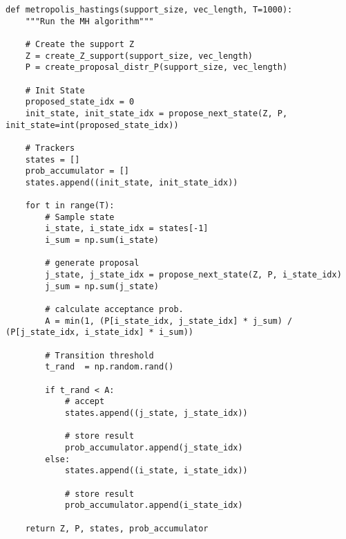 \label{sec:appendix1}

\begin{verbatim}
def metropolis_hastings(support_size, vec_length, T=1000):
    """Run the MH algorithm"""
    
    # Create the support Z
    Z = create_Z_support(support_size, vec_length)
    P = create_proposal_distr_P(support_size, vec_length)
    
    # Init State
    proposed_state_idx = 0
    init_state, init_state_idx = propose_next_state(Z, P, init_state=int(proposed_state_idx))
    
    # Trackers
    states = []
    prob_accumulator = []
    states.append((init_state, init_state_idx))
    
    for t in range(T):
        # Sample state
        i_state, i_state_idx = states[-1]
        i_sum = np.sum(i_state)
  
        # generate proposal
        j_state, j_state_idx = propose_next_state(Z, P, i_state_idx)
        j_sum = np.sum(j_state)
    
        # calculate acceptance prob.
        A = min(1, (P[i_state_idx, j_state_idx] * j_sum) / (P[j_state_idx, i_state_idx] * i_sum))
        
        # Transition threshold
        t_rand  = np.random.rand()

        if t_rand < A:
            # accept
            states.append((j_state, j_state_idx))
            
            # store result
            prob_accumulator.append(j_state_idx)
        else:
            states.append((i_state, i_state_idx))
            
            # store result
            prob_accumulator.append(i_state_idx)
            
    return Z, P, states, prob_accumulator
\end{verbatim}